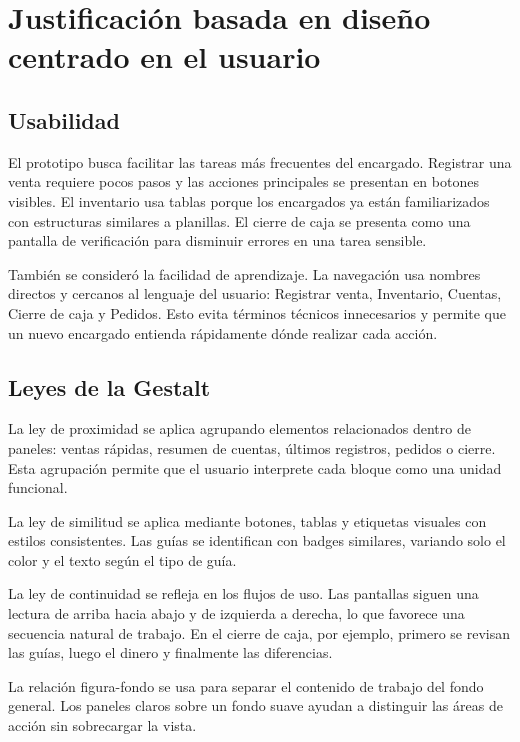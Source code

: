 ﻿\documentclass[12pt,letterpaper]{article}
\begin{document}
\section{Justificación basada en diseño centrado en el usuario}

\subsection{Usabilidad}

El prototipo busca facilitar las tareas más frecuentes del encargado. Registrar una venta requiere pocos pasos y las acciones principales se presentan en botones visibles. El inventario usa tablas porque los encargados ya están familiarizados con estructuras similares a planillas. El cierre de caja se presenta como una pantalla de verificación para disminuir errores en una tarea sensible.

También se consideró la facilidad de aprendizaje. La navegación usa nombres directos y cercanos al lenguaje del usuario: Registrar venta, Inventario, Cuentas, Cierre de caja y Pedidos. Esto evita términos técnicos innecesarios y permite que un nuevo encargado entienda rápidamente dónde realizar cada acción.

\subsection{Leyes de la Gestalt}

La ley de proximidad se aplica agrupando elementos relacionados dentro de paneles: ventas rápidas, resumen de cuentas, últimos registros, pedidos o cierre. Esta agrupación permite que el usuario interprete cada bloque como una unidad funcional.

La ley de similitud se aplica mediante botones, tablas y etiquetas visuales con estilos consistentes. Las guías se identifican con badges similares, variando solo el color y el texto según el tipo de guía.

La ley de continuidad se refleja en los flujos de uso. Las pantallas siguen una lectura de arriba hacia abajo y de izquierda a derecha, lo que favorece una secuencia natural de trabajo. En el cierre de caja, por ejemplo, primero se revisan las guías, luego el dinero y finalmente las diferencias.

La relación figura-fondo se usa para separar el contenido de trabajo del fondo general. Los paneles claros sobre un fondo suave ayudan a distinguir las áreas de acción sin sobrecargar la vista.
\end{document}
